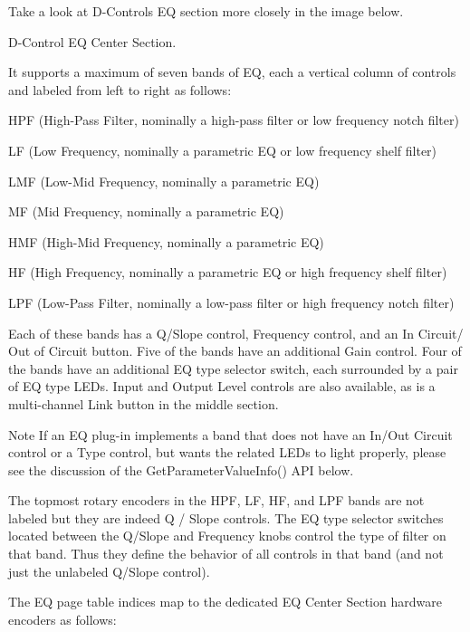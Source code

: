Take a look at D-\/\+Control\textquotesingle{}s EQ section more closely in the image below.

  D-\/\+Control EQ Center Section. 

It supports a maximum of seven bands of EQ, each a vertical column of controls and labeled from left to right as follows\+: 
\begin{DoxyItemize}
\item H\+PF (High-\/\+Pass Filter, nominally a high-\/pass filter or low frequency notch filter)  
\item LF (Low Frequency, nominally a parametric EQ or low frequency shelf filter)  
\item L\+MF (Low-\/\+Mid Frequency, nominally a parametric EQ)  
\item MF (Mid Frequency, nominally a parametric EQ)  
\item H\+MF (High-\/\+Mid Frequency, nominally a parametric EQ)  
\item HF (High Frequency, nominally a parametric EQ or high frequency shelf filter)  
\item L\+PF (Low-\/\+Pass Filter, nominally a low-\/pass filter or high frequency notch filter)  
\end{DoxyItemize}

Each of these bands has a Q/\+Slope control, Frequency control, and an In Circuit/ Out of Circuit button. Five of the bands have an additional Gain control. Four of the bands have an additional EQ type selector switch, each surrounded by a pair of EQ type L\+ED\textquotesingle{}s. Input and Output Level controls are also available, as is a multi-\/channel Link button in the middle section.

\begin{DoxyNote}{Note}
If an EQ plug-\/in implements a band that does not have an In/\+Out Circuit control or a Type control, but wants the related L\+ED\textquotesingle{}s to light properly, please see the discussion of the {\ttfamily Get\+Parameter\+Value\+Info()} A\+PI below.
\end{DoxyNote}
The topmost rotary encoders in the H\+PF, LF, HF, and L\+PF bands are not labeled but they are indeed Q / Slope controls. The EQ type selector switches located between the Q/\+Slope and Frequency knobs control the type of filter on that band. Thus they define the behavior of all controls in that band (and not just the unlabeled Q/\+Slope control).

The EQ page table indices map to the dedicated EQ Center Section hardware encoders as follows\+:



